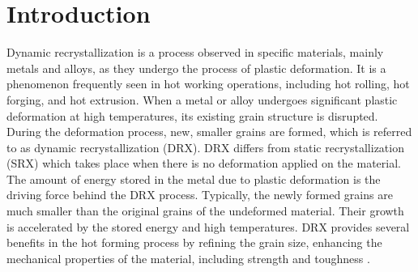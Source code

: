 \documentclass[metals,article,submit,pdftex,moreauthors]{Definitions/mdpi}
\begin{document}
\section{Introduction\label{sec:Introduction}}

Dynamic recrystallization is a process observed in specific materials, mainly metals and alloys, as they undergo the process of plastic deformation.
It is a phenomenon frequently seen in hot working operations, including hot rolling, hot forging, and hot extrusion.
When a metal or alloy undergoes significant plastic deformation at high temperatures, its existing grain structure is disrupted.
During the deformation process, new, smaller grains are formed, which is referred to as dynamic recrystallization (DRX).
DRX differs from static recrystallization (SRX) which takes place when there is no deformation applied on the material.
The amount of energy stored in the metal due to plastic deformation is the driving force behind the DRX process.
Typically, the newly formed grains are much smaller than the original grains of the undeformed material.
Their growth is accelerated by the stored energy and high temperatures.
DRX provides several benefits in the hot forming process by refining the grain size, enhancing the mechanical properties of the material, including strength and toughness \cite{Javidikia-2023, Shen-2021}.
\end{document}
